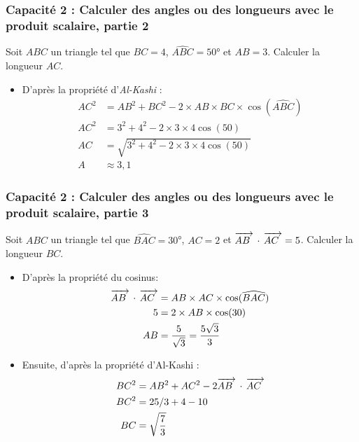 \documentclass[11pt, hyperref={urlcolor=red,%
            linkcolor=blue, %
            colorlinks=true}]{beamer}
\newcommand{\scal}[2]{\vect{#1} \, \cdot \, \vect{#2}}
\newcommand{\vect}[1]{\mathchoice%
{\overrightarrow{\displaystyle\mathstrut#1\,\,}}%
{\overrightarrow{\textstyle\mathstrut#1\,\,}}%
{\overrightarrow{\scriptstyle\mathstrut#1\,\,}}%
{\overrightarrow{\scriptscriptstyle\mathstrut#1\,\,}}}
\begin{document}
\begin{frame}
\label{capacite2}
\frametitle{Capacité 2 : Calculer des angles ou des longueurs avec le produit scalaire, partie 2}

Soit $ABC$ un triangle tel que $BC=4$, $\widehat{ABC}=50$° et $AB=3$. Calculer la longueur $AC$.

\begin{itemize}
\pause \item  D'après la propriété d'\textit{Al-Kashi} :
\begin{align*}
AC^{2} &=AB^{2} + BC^{2} - 2 \times AB \times BC \times \cos(\widehat{ABC})\\
AC^{2} &= 3^{2}+4^{2}-2 \times 3 \times 4 \cos(50) \\
AC &= \sqrt{3^{2}+4^{2}-2 \times 3 \times 4 \cos(50)}\\
A &\approx 3,1
\end{align*}

\end{itemize}
\end{frame}



\begin{frame}
\frametitle{Capacité 2 : Calculer des angles ou des longueurs avec le produit scalaire, partie 3}

Soit $ABC$ un triangle tel que $\widehat{BAC}=30$°, $AC=2$ et  $\scal{AB}{AC}=5$. Calculer la longueur $BC$.

\begin{itemize}
\pause \item  D'après la propriété du cosinus:
\begin{align*}
\scal{AB}{AC} &= AB \times AC \times \cos(\widehat{BAC}) \\
5 &= 2\times AB \times \cos(30) \\
AB &= \frac{5}{\sqrt{3}}=\frac{5\sqrt{3}}{3}
\end{align*}
\pause \item Ensuite, d'après la propriété d'Al-Kashi :
\begin{align*}
BC^{2} &=AB^{2} + AC^{2} - 2 \scal{AB}{AC}\\
BC^{2} &= 25/3 + 4 - 10 \\
BC &= \sqrt{\frac{7}{3}}
\end{align*}

\end{itemize}
\end{frame}
\end{document}
